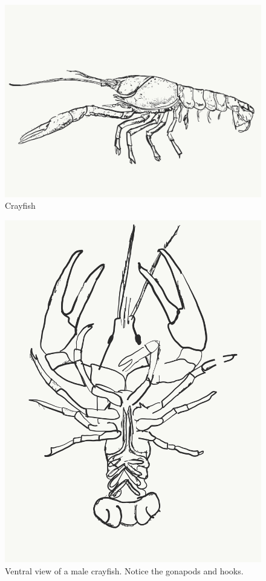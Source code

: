 \begin{figure}

{\centering \includegraphics[width=0.7\linewidth]{./figures/nematoda/crayfish}

}

\caption{Crayfish}\label{fig:crayfish}
\end{figure}

\begin{figure}

{\centering \includegraphics[width=0.7\linewidth]{./figures/nematoda/male_crayfish}

}

\caption{Ventral view of a male crayfish. Notice the gonapods and hooks.}\label{fig:malecray}
\end{figure}

